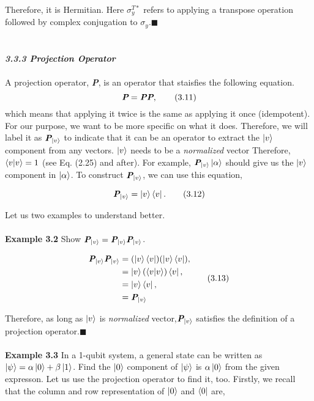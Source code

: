 \documentclass{article}
\begin{document}
Therefore, it is Hermitian. Here $\sigma_{y}^{T*}$ refers to applying
a transpose operation followed by complex conjugation to $\sigma_{y}$.\hfill $\blacksquare$
\\
\\
\\
\textit{\textbf{\large 3.3.3 Projection Operator}}\\
\\
A projection operator, \textit{\textbf{P}}, is an operator that staisfies the following equation.
\begin{equation}
    \textit{\textbf{P}}=\textit{\textbf{P}}\textit{\textbf{P}}, \tag{3.11}
\end{equation}
which means that applying it twice is the same as applying it once (idempotent).
For our purpose, we want to be more specific on what it does. Therefore, we will label it as 
$\textit{\textbf{P}}_{\ket{v}}$ to indicate that it can be an operator to extract the
$\ket{v}$ component from any vectors. $\ket{v}$ needs to be a \textit{normalized} vector
Therefore, $\braket{v|v}=1$ (see Eq. (2.25) and after). For example, $\textit{\textbf{P}}_{\ket{v}}\ket{\alpha}$
should give us the $\ket{v}$ component in $\ket{\alpha}$. To construct
$\textit{\textbf{P}}_{\ket{v}}$, we can use this equation,

\begin{equation} \label{eq 3.12}
    \textit{\textbf{P}}_{\ket{v}}=\ket{v}\bra{v}. \tag{3.12}
\end{equation}


Let us two examples to understand better.
\\ \\ 
\textbf{Example 3.2} Show $\textit{\textbf{P}}_{\ket{v}}=\textit{\textbf{P}}_{\ket{v}}\textit{\textbf{P}}_{\ket{v}}$.

\begin{align} \label{eq 3.13}
    \begin{split}
        \textit{\textbf{P}}_{\ket{v}}\textit{\textbf{P}}_{\ket{v}}&=(\ket{v}\bra{v})(\ket{v}\bra{v}),\\
        &=\ket{v}(\braket{v|v})\bra{v},\\
        &=\ket{v}\bra{v},\\
        &=\textit{\textbf{P}}_{\ket{v}}
    \end{split} \tag{3.13}
\end{align}

Therefore, as long as $\ket{v}$ is \textit{normalized} vector,$\textit{\textbf{P}}_{\ket{v}}$
satisfies the definition of a projection operator.\hfill $\blacksquare$
\\\\
\textbf{Example 3.3} In a 1-qubit system, a general state can be written as $\ket{\psi}=\alpha\ket{0}+\beta\ket{1}$.
Find the $\ket{0}$ component of $\ket{\psi}$ is $\alpha\ket{0}$ from the given expresson.
Let us use the projection operator to find it, too. Firstly, we recall that the column and row representation of $\ket{0}$ and $\bra{0}$
are, 
\end{document}
